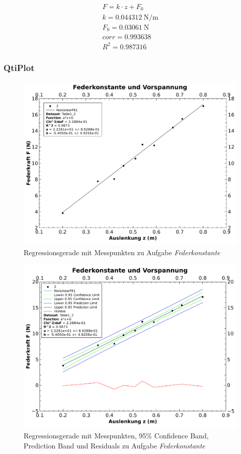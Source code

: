 \begin{gather*}
    F = k \cdot z + F_0 \\
    k = \SI{0.044312}{\newton\per\meter} \\
    F_0 = \SI{0.03061}{\newton} \\
    corr = 0.993638 \\
    R^2 = 0.987316
\end{gather*}

\subsubsection{QtiPlot}
\begin{figure}[th!]
    \centering
    \includegraphics[width=.8\textwidth]{images/aufgabe3-1.pdf}
    \caption{Regressionsgerade mit Messpunkten zu Aufgabe \emph{Federkonstante}}
    \label{fig:gauss}
\end{figure}
\begin{figure}[th!]
    \centering
    \includegraphics[width=.8\textwidth]{images/aufgabe3-2.pdf}
    \caption{Regressionsgerade mit Messpunkten, 95\% Confidence Band, Prediction Band und Residuals zu Aufgabe \emph{Federkonstante}}
    \label{fig:gauss}
\end{figure}

